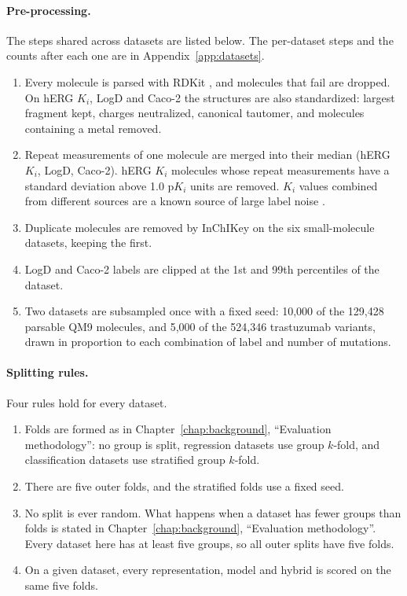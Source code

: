 \paragraph{Pre-processing.} The steps shared across datasets are listed below. The per-dataset steps and the counts after each one are in Appendix~\ref{app:datasets}.
\begin{enumerate}[leftmargin=*]
    \item Every molecule is parsed with RDKit \citep{rdkit}, and molecules that fail are dropped. On hERG $K_i$, LogD and Caco-2 the structures are also standardized: largest fragment kept, charges neutralized, canonical tautomer, and molecules containing a metal removed.
    \item Repeat measurements of one molecule are merged into their median (hERG $K_i$, LogD, Caco-2). hERG $K_i$ molecules whose repeat measurements have a standard deviation above 1.0 p$K_i$ units are removed. $K_i$ values combined from different sources are a known source of large label noise \citep{landrum2024}.
    \item Duplicate molecules are removed by InChIKey on the six small-molecule datasets, keeping the first.
    \item LogD and Caco-2 labels are clipped at the 1st and 99th percentiles of the dataset.
    \item Two datasets are subsampled once with a fixed seed: 10,000 of the 129,428 parsable QM9 molecules, and 5,000 of the 524,346 trastuzumab variants, drawn in proportion to each combination of label and number of mutations.
\end{enumerate}

\paragraph{Splitting rules.} Four rules hold for every dataset.
\begin{enumerate}[leftmargin=*]
    \item Folds are formed as in Chapter~\ref{chap:background}, ``Evaluation methodology'': no group is split, regression datasets use group $k$-fold, and classification datasets use stratified group $k$-fold.
    \item There are five outer folds, and the stratified folds use a fixed seed.
    \item No split is ever random. What happens when a dataset has fewer groups than folds is stated in Chapter~\ref{chap:background}, ``Evaluation methodology''. Every dataset here has at least five groups, so all outer splits have five folds.
    \item On a given dataset, every representation, model and hybrid is scored on the same five folds.
\end{enumerate}

